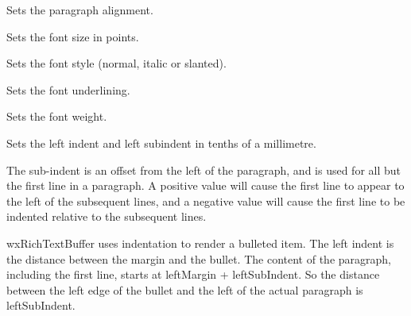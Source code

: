 \label{wxrichtextattrsetfontfacename}


Sets the paragraph alignment.

\label{wxrichtextattrsetfontsize}


Sets the font size in points.

\label{wxrichtextattrsetfontstyle}


Sets the font style (normal, italic or slanted).

\label{wxrichtextattrsetfontunderlined}


Sets the font underlining.

\label{wxrichtextattrsetfontweight}


Sets the font weight.

\label{wxrichtextattrsetleftindent}


Sets the left indent and left subindent in tenths of a millimetre.

The sub-indent is an offset from the left of the paragraph, and is used for all but the
first line in a paragraph. A positive value will cause the first line to appear to the left
of the subsequent lines, and a negative value will cause the first line to be indented
relative to the subsequent lines.

wxRichTextBuffer uses indentation to render a bulleted item. The left indent is the distance between
the margin and the bullet. The content of the paragraph, including the first line, starts
at leftMargin + leftSubIndent. So the distance between the left edge of the bullet and the
left of the actual paragraph is leftSubIndent.

\label{wxrichtextattrsetlinespacing}

